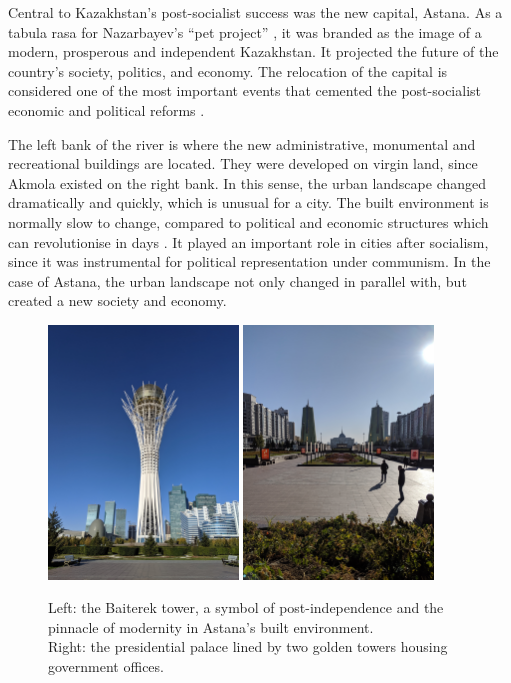 \documentclass{article}
\begin{document}
Central to Kazakhstan's post-socialist success was the new capital, Astana. As a tabula rasa for Nazarbayev's ``pet project'' \parencite{koch2010monumental}, it was branded as the image of a modern, prosperous and independent Kazakhstan. It projected the future of the country's society, politics, and economy. The relocation of the capital is considered one of the most important events that cemented the post-socialist economic and political reforms \parencite{kassymbekov_2020}.

The left bank of the river is where the new administrative, monumental and recreational buildings are located. 
They were developed on virgin land, since Akmola existed on the right bank. 
In this sense, the urban landscape changed dramatically and quickly, which is unusual for a city. The built environment is normally slow to change, compared to political and economic structures which can revolutionise in days \parencite{stanilov2007post}. It played an important role in cities after socialism, since it was instrumental for political representation under communism. In the case of Astana, the urban landscape not only changed in parallel with, but created a new society and economy. 

\begin{figure}[h!]
	\centering
	\captionsetup{labelformat=empty}
	\includegraphics[width=0.45\textwidth]{astana_modernity}
	\includegraphics[width=0.45\textwidth]{astana_modernity15}
	\caption{Left: the Baiterek tower, a symbol of post-independence and the pinnacle of modernity in Astana's built environment.
	\\Right: the presidential palace lined by two golden towers housing government offices.}
\end{figure}
\end{document}
